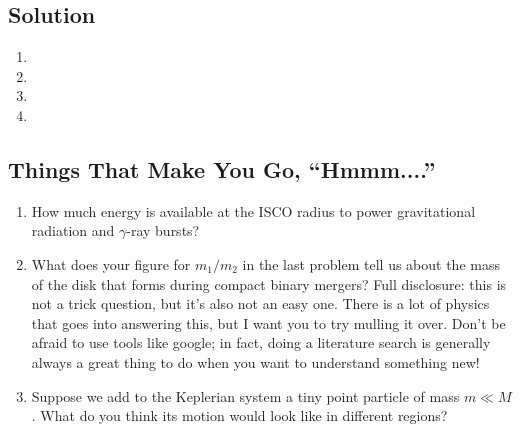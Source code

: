 \documentclass[11pt]{article}
\begin{document}

\vspace{1000pt}


\subsection*{Solution}

\begin{enumerate}

\item 

\item 

\item 

\item 

\end{enumerate}


\begin{mdframed}

\section*{Things That Make You Go, ``Hmmm....''}

\begin{enumerate}

\item How much energy is available at the ISCO radius to power gravitational radiation and $\gamma$-ray bursts?

\item What does your figure for $m_1/m_2$ in the last problem tell us about the mass of the disk that forms during compact binary mergers? Full disclosure: this is not a trick question, but it's also not an easy one. There is a lot of physics that goes into answering this, but I want you to try mulling it over. Don't be afraid to use tools like google; in fact, doing a literature search is generally always a great thing to do when you want to understand something new!

\item Suppose we add to the Keplerian system a tiny point particle of mass $m \ll M$. What do you think its motion would look like in different regions?

\end{enumerate}

\end{mdframed}
\end{document}
